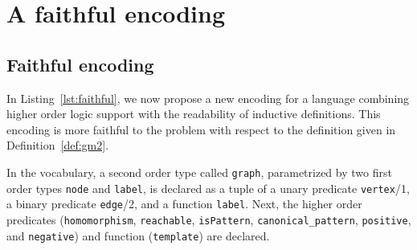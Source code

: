 \vspace{-10pt}
\section{A faithful encoding}\label{sec:extension}


\subsection{Faithful encoding}
In Listing~\ref{lst:faithful}, we now propose a new encoding for a language combining higher order logic support with the readability of inductive definitions.
This encoding is more faithful to the problem with respect to the definition given in Definition~\ref{def:gm2}.

In the vocabulary, a second order type called \lstinline{graph}, parametrized by two first order types \lstinline{node} and {\lstset{breakatwhitespace} \lstinline{label},} is declared as a tuple of a unary predicate \lstinline{vertex}/1, a binary predicate \lstinline{edge}/2, and a function \lstinline|label|.
Next, the higher order predicates (\lstinline|homomorphism|, \lstinline|reachable|, \lstinline|isPattern|, \lstinline|canonical_pattern|, \lstinline|positive|, and \lstinline|negative|) and function (\lstinline|template|) are declared.

